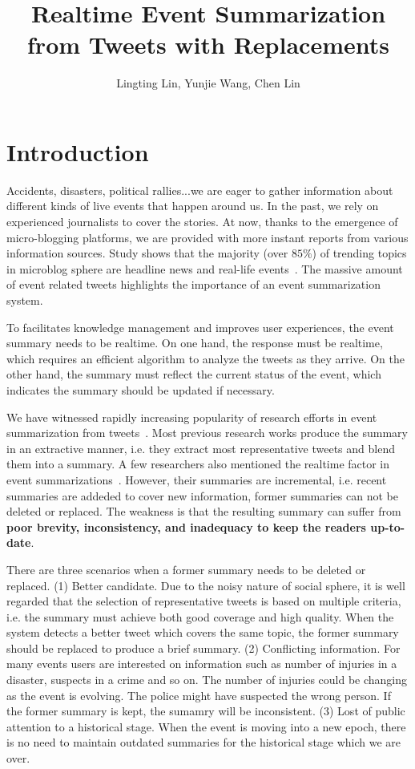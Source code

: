 \documentclass{article}
\author{Lingting Lin, Yunjie Wang, Chen Lin}
\title{Realtime Event Summarization from Tweets with Replacements}
\begin{document}
\maketitle
\section{Introduction}
Accidents, disasters, political rallies...we are eager to gather information about different kinds of live events that happen around us. In the past, we rely on experienced journalists to cover the stories. At now, thanks to the emergence of micro-blogging platforms, we are provided with more instant reports from various information sources. Study shows that the majority (over $85\%$) of trending topics in microblog sphere are headline news and real-life events~\cite{kwak2010twitter}. The massive amount of event related tweets highlights the importance of an event summarization system. 

To facilitates knowledge management and improves user experiences, the event summary needs to be realtime. On one hand, the response must be realtime, which requires an efficient algorithm to analyze the tweets as they arrive. On the other hand, the summary must reflect the current status of the event, which indicates the summary should be updated if necessary. 


We have witnessed rapidly increasing popularity of research efforts in event summarization from tweets~\cite{}.  Most previous research works produce the summary in an extractive manner, i.e. they extract most representative tweets and blend them into a summary. A few researchers also mentioned the realtime factor in event summarizations~\cite{}. However, their summaries are incremental, i.e. recent summaries are addeded to cover new information, former summaries can not be deleted or replaced. The weakness is that the resulting summary can suffer from \textbf{poor brevity, inconsistency, and inadequacy to keep the readers up-to-date}.


There are three scenarios when a former summary needs to be deleted or replaced. (1) Better candidate. Due to the noisy nature of social sphere, it is well regarded that the selection of representative tweets is based on multiple criteria, i.e. the summary must achieve both good coverage and high quality. When the system detects a better tweet which covers the same topic, the former summary should be replaced to produce a brief summary. (2) Conflicting information. For many events users are interested on information such as number of injuries in a disaster, suspects in a crime and so on. The number of injuries could be changing as the event is evolving. The police might have suspected the wrong person. If the former summary is kept, the sumamry will be inconsistent. (3) Lost of public attention to a historical stage. When the event is moving into a new epoch, there is no need to maintain outdated summaries for the historical stage which we are over.
\end{document}
